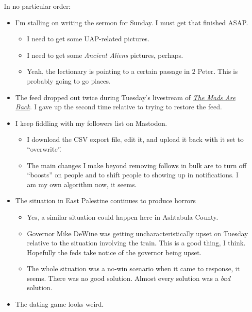 In no particular order:

\begin{itemize}
\tightlist
\item
  I'm stalling on writing the sermon for Sunday. I must get that
  finished ASAP.

  \begin{itemize}
  \tightlist
  \item
    I need to get some UAP-related pictures.
  \item
    I need to get some \emph{Ancient Aliens} pictures, perhaps.
  \item
    Yeah, the lectionary is pointing to a certain passage in 2 Peter.
    This is probably going to go places.
  \end{itemize}
\item
  The feed dropped out twice during Tuesday's livestream of
  \href{https://www.themadsareback.com/event/dimension-5-livestream-screening/}{\emph{The
  Mads Are Back}}. I gave up the second time relative to trying to
  restore the feed.
\item
  I keep fiddling with my followers list on Mastodon.

  \begin{itemize}
  \tightlist
  \item
    I download the CSV export file, edit it, and upload it back with it
    set to ``overwrite''.
  \item
    The main changes I make beyond removing follows in bulk are to turn
    off ``boosts'' on people and to shift people to showing up in
    notifications. I am my own algorithm now, it seems.
  \end{itemize}
\item
  The situation in East Palestine continues to produce horrors

  \begin{itemize}
  \tightlist
  \item
    Yes, a similar situation could happen here in Ashtabula County.
  \item
    Governor Mike DeWine was getting uncharacteristically upset on
    Tuesday relative to the situation involving the train. This is a
    good thing, I think. Hopefully the feds take notice of the governor
    being upset.
  \item
    The whole situation was a no-win scenario when it came to response,
    it seems. There was no good solution. Almost every solution was a
    \emph{bad} solution.
  \end{itemize}
\item
  The dating game looks weird.


\end{itemize}
